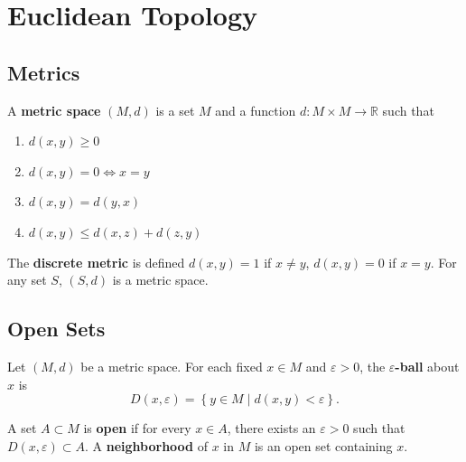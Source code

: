 \documentclass[10pt]{report}
\begin{document}
\tableofcontents


\chapter{Euclidean Topology}


\section{Metrics}

\begin{defn}[]
	A \textbf{metric space} $(M,d)$ is a set $M$ and a function $d: M \times M \to \mathbb{R}$ such that
	\begin{enumerate}
		\item $d(x,y) \geq 0$ 
		\item $d(x,y) = 0 \iff x=y$ 
		\item $d(x,y) = d(y,x)$ 
		\item $d(x,y) \leq d(x,z) + d(z,y)$
	\end{enumerate}
\end{defn}

\begin{ex}[]
	 The \textbf{discrete metric} is defined $d(x,y)=1$ if $x\neq y$, $d(x,y)=0$ if $x=y$. For any set $S$, $(S,d)$ is a metric space.
\end{ex}

\pagebreak


\section{Open Sets}

\begin{defn}[]
	Let $(M,d)$ be a metric space. For each fixed $x\in M$ and $\varepsilon>0$, the \textbf{$\varepsilon$-ball} about $x$ is
	\[
		D(x,\varepsilon) = \left\{ y \in M \;|\; d(x,y) < \varepsilon \right\}.
	\] 
\end{defn}

\begin{defn}[]
	A set $A  \subset M$ is \textbf{open} if for every $x \in A$, there exists an $\varepsilon>0$ such that $D(x,\varepsilon) \subset A$. A \textbf{neighborhood} of $x$ in $M$ is an open set containing $x$.
\end{defn}
\end{document}
